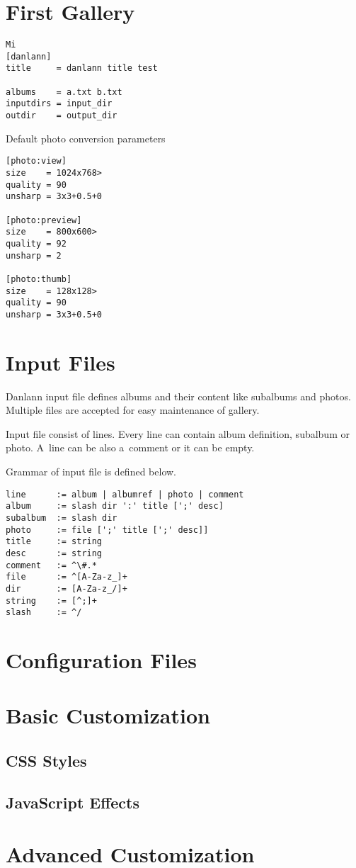 \documentclass{article}
\begin{document}
\section{First Gallery}
\begin{lstlisting}
Mi
[danlann]
title     = danlann title test

albums    = a.txt b.txt
inputdirs = input_dir
outdir    = output_dir
\end{lstlisting}

Default photo conversion parameters
\begin{lstlisting}
[photo:view]
size    = 1024x768>
quality = 90
unsharp = 3x3+0.5+0

[photo:preview]
size    = 800x600>
quality = 92
unsharp = 2

[photo:thumb]
size    = 128x128>
quality = 90
unsharp = 3x3+0.5+0
\end{lstlisting}

\section{Input Files}
Danlann input file defines albums and their content like subalbums and
photos. Multiple files are accepted for easy maintenance of gallery.

Input file consist of lines. Every line can contain album definition,
subalbum or photo. A~line can be also a~comment or it can be empty.

Grammar of input file is defined below.

\begin{lstlisting}
line      := album | albumref | photo | comment
album     := slash dir ':' title [';' desc]
subalbum  := slash dir
photo     := file [';' title [';' desc]]
title     := string
desc      := string
comment   := ^\#.*
file      := ^[A-Za-z_]+
dir       := [A-Za-z_/]+
string    := [^;]+
slash     := ^/
\end{lstlisting}

\section{Configuration Files}

\section{Basic Customization}
\subsection{CSS Styles}
\subsection{JavaScript Effects}

\section{Advanced Customization}
\end{document}
